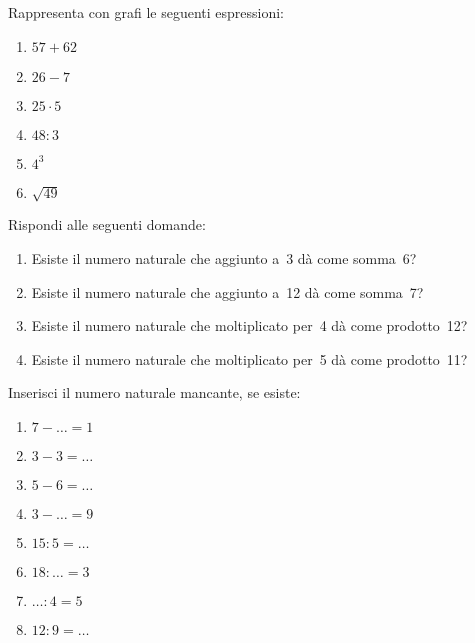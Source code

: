 \begin{esercizio}
Rappresenta con grafi le seguenti espressioni:
\begin{multicols}{3}
 \begin{enumerate}[noitemsep, label=(\alph*)]
 \item \(57 + 62\) \qquad
 \item \(26 - 7\) \qquad
 \item \(25 \cdot 5\) \qquad
 \item \(48 : 3\) \qquad
 \item \(4^3\) \qquad
 \item \(\sqrt{49}\) \qquad
 \end{enumerate}
\end{multicols}
\end{esercizio}

\begin{esercizio}
Rispondi alle seguenti domande:
 \begin{enumerate}[noitemsep, label=(\alph*)]
 \item Esiste il numero naturale che aggiunto a~3 dà come somma~6?
 \item Esiste il numero naturale che aggiunto a~12 dà come somma~7?
 \item Esiste il numero naturale che moltiplicato per~4 dà come prodotto~12?
 \item Esiste il numero naturale che moltiplicato per~5 dà come prodotto~11?
 \end{enumerate}
\end{esercizio}

\begin{esercizio}
 Inserisci il numero naturale mancante, se esiste:
\begin{multicols}{4}
\begin{enumerate}[noitemsep, label=(\alph*)]
 \item \(7-\ldots =1\) \qquad
 \item\(3-3=\ldots~\) \qquad
 \item\(5-6=\ldots~\) \qquad
 \item \(3-\ldots =9\) \qquad
 \item\(15:5=\ldots~\) \qquad
 \item\(18:\ldots =3\) \qquad
 \item \(\ldots:4=5\) \qquad
 \item\(12:9=\ldots~\) 
\end{enumerate}
\end{multicols}
\end{esercizio}

